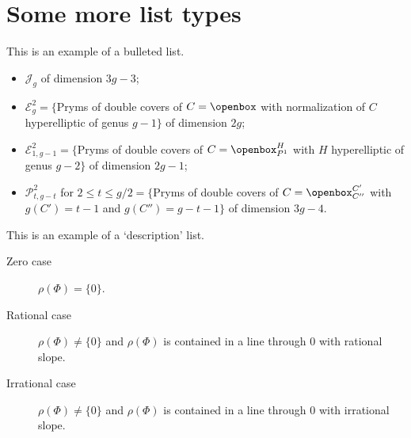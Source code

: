 \begin{figure}[tb]
\caption{}\label{otherfig}
\end{figure}

\section{Some more list types}
This is an example of a bulleted list.

\begin{itemize}
\item $\mathcal{J}_g$ of dimension $3g-3$;
\item $\mathcal{E}^2_g=\{$Pryms of double covers of $C=\openbox$ with
normalization of $C$ hyperelliptic of genus $g-1\}$ of dimension $2g$;
\item $\mathcal{E}^2_{1,g-1}=\{$Pryms of double covers of
$C=\openbox^H_{P^1}$ with $H$ hyperelliptic of genus $g-2\}$ of
dimension $2g-1$;
\item $\mathcal{P}^2_{t,g-t}$ for $2\le t\le g/2=\{$Pryms of double
covers of $C=\openbox^{C'}_{C''}$ with $g(C')=t-1$ and $g(C'')=g-t-1\}$
of dimension $3g-4$.
\end{itemize}

This is an example of a `description' list.

\begin{description}
\item[Zero case] $\rho(\Phi) = \{0\}$.

\item[Rational case] $\rho(\Phi) \ne \{0\}$ and $\rho(\Phi)$ is
contained in a line through $0$ with rational slope.

\item[Irrational case] $\rho(\Phi) \ne \{0\}$ and $\rho(\Phi)$ is
contained in a line through $0$ with irrational slope.
\end{description}

\endinput  %